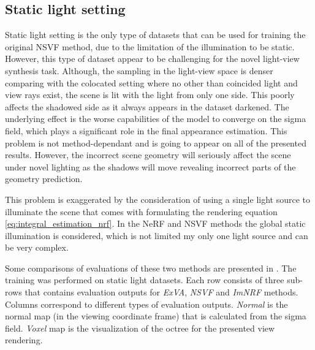




\subsection{Static light setting}

Static light setting is the only type of datasets that can be used
for training the original NSVF method,
due to the limitation of the illumination to be static.
However, this type of dataset appear to be challenging for the novel light-view synthesis task.
Although, the sampling in the light-view space is denser comparing with the colocated setting
where no other than coincided light and view rays exist,
the scene is lit with the light from only one side.
This poorly affects the shadowed side as it always appears in the dataset darkened.
The underlying effect is the worse capabilities of the model to converge on the sigma field,
which plays a significant role in the final appearance estimation.
This problem is not method-dependant and is going to appear on all of the presented results.
However, the incorrect scene geometry will seriously affect the scene under novel lighting
as the shadows will move revealing incorrect parts of the geometry prediction.

This problem is exaggerated by the consideration of using a single light source to illuminate the scene
that comes with formulating the rendering equation \cref{eq:integral_estimation_nrf}.
In the NeRF and NSVF methods the global static illumination is considered,
which is not limited my only one light source and can be very complex.





Some comparisons of evaluations of these two methods are presented in .
The training was performed on static light datasets.
Each row consists of three sub-rows that contains evaluation outputs for \textit{ExVA}, \textit{NSVF} and \textit{ImNRF} methods.
Columns correspond to different types of evaluation outputs.
\textit{Normal} is the normal map (in the viewing coordinate frame)
that is calculated from the sigma field.
\textit{Voxel} map is the visualization of the octree for the presented view rendering.

